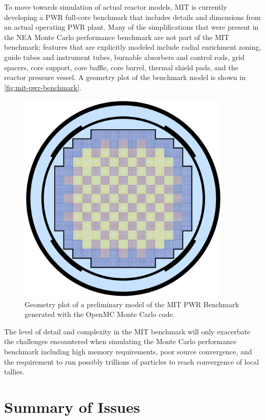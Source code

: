 To move towards simulation of actual reactor models, MIT is currently developing
a PWR full-core benchmark that includes details and dimensions from an actual
operating PWR plant. Many of the simplifications that were present in the NEA
Monte Carlo performance benchmark are not part of the MIT benchmark; features
that are explicitly modeled include radial enrichment zoning, guide tubes and
instrument tubes, burnable absorbers and control rods, grid spacers, core
support, core baffle, core barrel, thermal shield pads, and the reactor pressure
vessel. A geometry plot of the benchmark model is shown in
\autoref{fig:mit-pwr-benchmark}.
\begin{figure}[htb]
  \centering
  \includegraphics[width=4.0in]{figures/ch1/mit-pwr-benchmark.png}
  \caption{Geometry plot of a preliminary model of the MIT PWR Benchmark
    generated with the OpenMC Monte Carlo code.}
  \label{fig:mit-pwr-benchmark}
\end{figure}
The level of detail and complexity in the MIT benchmark will only exacerbate the
challenges encountered when simulating the Monte Carlo performance benchmark
including high memory requirements, poor source convergence, and the requirement
to run possibly trillions of particles to reach convergence of local tallies.

\section{Summary of Issues}


